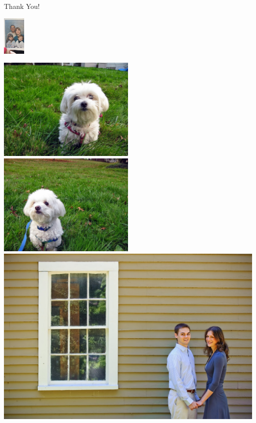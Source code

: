 \documentclass[12pt]{beamer}
\begin{document}
\begin{frame}{Thank You!}
\begin{minipage}{2in}
\includegraphics[height=0.75in, angle=-90]{family}
%
\hfill
%
\begin{minipage}[t]{1.25in}
\vspace{0in}
\includegraphics[width=0.5\textwidth]{julia}
\includegraphics[width=0.5\textwidth]{nicholas}\\
\includegraphics[width=\textwidth]{matthew}
\end{minipage}
\end{minipage}




\end{frame}
\end{document}
